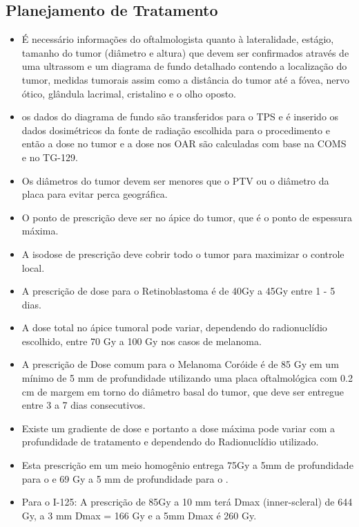 \documentclass[11pt,a4paper]{article}
\begin{document}
\subsection{Planejamento de Tratamento} 


    \begin{itemize}
        \item É necessário informações do oftalmologista quanto à lateralidade, estágio, tamanho do tumor (diâmetro e altura) que devem ser confirmados através de uma ultrassom e um diagrama de fundo detalhado contendo a localização do tumor, medidas tumorais assim como a distância do tumor até a fóvea, nervo ótico, glândula lacrimal,  cristalino e o olho oposto.
        \item os dados do diagrama de fundo são transferidos para o TPS e é inserido os dados dosimétricos da fonte de radiação escolhida para o procedimento e então a dose no tumor e a dose nos OAR são calculadas com base na COMS e no TG-129.
        \item Os diâmetros do tumor devem ser menores que o PTV ou o diâmetro da placa para evitar perca geográfica.
        \item O ponto de prescrição deve ser no ápice do tumor, que é o ponto de espessura máxima.
        \item A isodose de prescrição deve cobrir todo o tumor para maximizar o controle local.
        \item A prescrição de dose para o Retinoblastoma é de 40Gy a 45Gy entre 1 - 5 dias.
        \item A dose total no ápice tumoral pode variar, dependendo do radionuclídio escolhido, entre 70 Gy a 100 Gy nos casos de melanoma.
        \item A prescrição de Dose comum para o Melanoma Coróide é de 85 Gy em um mínimo de 5 mm de profundidade utilizando uma placa oftalmológica com 0.2 cm de margem em torno do diâmetro basal do tumor, que deve ser entregue entre 3 a 7 dias consecutivos.
        \item Existe um gradiente de dose e portanto a dose máxima pode variar com a profundidade de tratamento e dependendo do Radionuclídio utilizado.
        \item Esta prescrição em um meio homogênio entrega 75Gy a 5mm de profundidade para o  e 69 Gy a 5 mm de profundidade para o .
        \item Para o I-125: A prescrição de 85Gy a  10 mm terá Dmax (inner-scleral) de 644 Gy, a 3 mm Dmax = 166 Gy e a  5mm Dmax  é 260 Gy.

\end{itemize}
\end{document}

